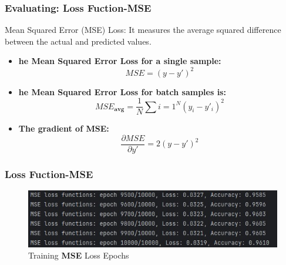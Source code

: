 \documentclass[aspectratio=1610]{beamer}
\begin{document}
\begin{frame}
    \frametitle{Evaluating: Loss Fuction-MSE}
    Mean Squared Error (MSE) Loss: 
    It measures the average squared difference between the actual and predicted values. 
    \vspace{0.5cm}
    \begin{itemize}

        \item \textbf{he Mean Squared Error Loss for a single sample:}
        \[
            MSE = (y - y')^2
        \]

        \item \textbf{he Mean Squared Error Loss for batch samples is:}
        \[
        MSE_{\textbf{avg}}= \frac{1}{N} \sum i = 1^N (y_i - y'_i)^2
        \]
        \item \textbf{The gradient of MSE:}
       \[
       \frac{\partial MSE}{\partial y'} =  2(y-y')^2
       \]
    \end{itemize}
\end{frame}

\begin{frame}
    \frametitle{ Loss Fuction-MSE}
   \begin{figure}
            \begin{center}
                \includegraphics[width=1\linewidth]{MSE.jpg}
                \caption{Training \textbf{MSE} Loss Epochs }
                \label{fig:modelE}
            \end{center}
        
    \end{figure}
\end{frame}
\end{document}
